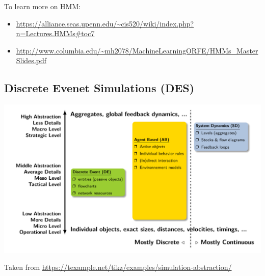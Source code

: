 To learn more on HMM:
\begin{itemize}
   \item \url{https://alliance.seas.upenn.edu/~cis520/wiki/index.php?n=Lectures.HMMs#toc7}
   \item \url{http://www.columbia.edu/~mh2078/MachineLearningORFE/HMMs_MasterSlides.pdf}
\end{itemize}

\subsection{Discrete Evenet Simulations (DES)}
  \begin{center}
    \includegraphics[width=0.7\linewidth]{../figures/simulation.pdf}
  \end{center}
  Taken from \url{https://texample.net/tikz/examples/simulation-abstraction/}
